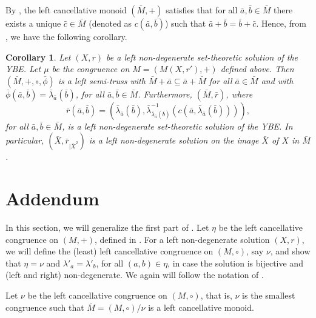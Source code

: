 \documentclass[10pt]{article}
\newtheorem{corollary}[theorem]{Corollary}
\begin{document}
By \cite[Lemma~5.8]{CJV}, the left cancellative monoid $(\bar M,+)$ satisfies that
for all $\bar a,\bar b\in\bar M$   there exists a unique $\bar c\in
	\bar M$ (denoted as $c(\bar{a},\bar{b})$) such that $\bar a+\bar b=\bar b+\bar c$.  
	Hence, from \cite[Proposition 5.4]{CJV}, we have the following corollary.

\begin{corollary}  Let $(X,r)$ be a left non-degenerate set-theoretic solution of the YBE. Let $\mu$ be the congruence on  $M=(M(X,r'),+)$ defined above.
	Then $(\bar M,+,\circ,\bar \phi)$ is a  left semi-truss   with $\bar M +\bar a \subseteq\bar a +\bar M$ for all $\bar a \in \bar M$ and 
	with $\bar\phi(\bar a,\bar b)=\bar\lambda_{\bar
		a}(\bar b)$, for all $\bar a,\bar b\in \bar M$.
	Furthermore,  $(\bar M,\bar r)$, where
	$$\bar r(\bar a,\bar b)=(\bar \lambda_{\bar a}(\bar b),\bar \lambda^{-1}_{\bar \lambda_{\bar a}(\bar b)}(c(\bar a,\bar \lambda_{\bar a}(\bar b)))),$$
	for all $\bar a,\bar b\in \bar M$, is a left non-degenerate
	set-theoretic solution of the YBE.
	In particular, $(\bar X, \bar r_{| \bar X^2})$ is a left non-degenerate solution on the image $\bar X$ of $X$ in $\bar M$.
\end{corollary}





\section{Addendum}
In this section, we will generalize the first part of \cite[Proposition 4.2]{JKV}.  
Let $\eta$ be the left cancellative congruence on $(M,+)$, defined in \cite{CJV}. 
For a left non-degenerate solution $(X,r)$, we will define the (least)  left cancellative congruence on $(M,\circ)$, say $\nu$, and show that $\eta=\nu$ and $\lambda'_a=\lambda'_b$, for all $(a,b)\in \eta$, in case the solution is bijective and (left and right) non-degenerate. 
We again will follow the notation of \cite{CJV}.  



Let $\nu$ be the left cancellative congruence on $(M,\circ)$, that is,
$\nu$ is the smallest congruence such that $\bar M=(M,\circ)/\nu$ is a
left cancellative monoid.
\end{document}
